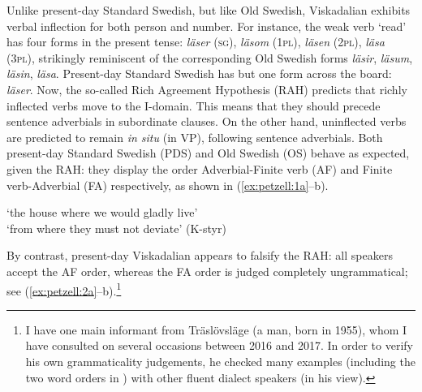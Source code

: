 \documentclass[output=paper,colorlinks,citecolor=brown,draft,draftmode]{langscibook}
\begin{document}
Unlike present-day Standard Swedish, but like Old Swedish, Viskadalian exhibits verbal inflection for both person and number. For instance, the weak verb ‘read’ has four forms in the present tense: \textit{läser} (\textsc{sg}), \textit{läsom} (1\textsc{pl}), \textit{läsen} (2\textsc{pl}), \textit{läsa} (3\textsc{pl}), strikingly reminiscent of the corresponding Old Swedish forms \textit{läsir}, \textit{läsum}, \textit{läsin}, \textit{läsa}. Present-day Standard Swedish has but one form across the board: \textit{läser}. Now, the so-called Rich Agreement Hypothesis (RAH) predicts that richly inflected verbs move to the I-domain. This means that they should precede sentence adverbials in subordinate clauses. On the other hand, uninflected verbs are predicted to remain \textit{in situ} (in VP), following sentence adverbials. Both present-day Standard Swedish (PDS) and Old Swedish (OS) behave as expected, given the RAH: they display the order Adverbial-Finite verb (AF) and Finite verb-Adverbial (FA) respectively, as shown in (\ref{ex:petzell:1a}–b).


\ea\label{ex:petzell:1}
\glt `the house where we would gladly live’  \\
\glt `from where they must not deviate’ (K-styr)
\z
\z


By contrast, present-day Viskadalian appears to falsify the RAH: all speakers accept the AF order, whereas the FA order is judged completely ungrammatical; see (\ref{ex:petzell:2a}–b).\footnote{I have one main informant from Träslövsläge (a man, born in 1955), whom I have consulted on several occasions between 2016 and 2017. In order to verify his own grammaticality judgements, he checked many examples (including the two word orders in ) with other fluent dialect speakers (in his view).}
\end{document}
